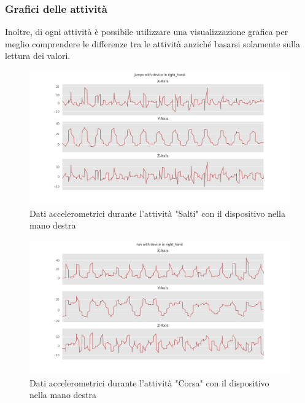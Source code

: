 \subsubsection{Grafici delle attività}
Inoltre, di ogni attività è possibile utilizzare una visualizzazione grafica per meglio comprendere le differenze tra le attività anziché 
basarsi solamente sulla lettura dei valori.

\begin{figure}[H]
    \centering
    \includegraphics[scale = 0.45]{assets/images/classifications/accelerometer/right_hand/jumps-right-hand-acc.png}
    \caption{Dati accelerometrici durante l'attività "Salti" con il dispositivo nella mano destra}
\end{figure}
\begin{figure}[H]
    \centering
    \includegraphics[scale = 0.45]{assets/images/classifications/accelerometer/right_hand/run-right-hand-acc.png}
    \caption{Dati accelerometrici durante l'attività "Corsa" con il dispositivo nella mano destra}
\end{figure}
